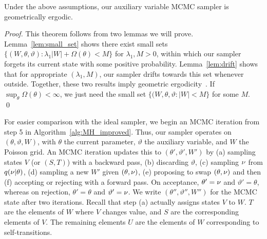 

\begin{theorem}
Under the above assumptions, our auxiliary variable MCMC sampler is
geometrically ergodic.  \label{thm:geom_erg}
\end{theorem}
\begin{proof}
\noindent This theorem follows from two lemmas we will prove.
Lemma~\ref{lem:small_set} shows there exist small sets 
$\{(W,\theta,\vartheta): \lambda_1|W| + \Omega(\theta) < M \}$ for 
$\lambda_1, M > 0$, within which our sampler forgets its current state with 
some positive probability. Lemma~\ref{lem:drift}
shows that for appropriate $(\lambda_1,M)$, our sampler drifts towards this set whenever
outside. Together, these two results imply geometric
ergodicity~\citep[Theorems 15.0.1 and Lemma 15.2.8]{meyn2009}.
If $\sup_\theta \Omega(\theta) < \infty$, we just need 
the small set $\{(W,\theta,\vartheta: |W| < M \}$ for some $M$.
\qed
\end{proof}
For easier comparison with the ideal sampler, we begin an MCMC 
iteration from step 5 in
Algorithm~\ref{alg:MH_improved}. Thus, our sampler operates on 
$(\theta,\vartheta,W)$,  with $\theta$ the current 
parameter, $\vartheta$ the auxiliary variable, and $W$ the Poisson grid. 
An MCMC iteration updates this to $(\theta',\vartheta',W')$ by 
(a) sampling states $V$ (or $(S,T)$)  with a backward pass, 
(b) discarding $\vartheta$, (c) sampling $\nu$ from $q(\nu|\theta)$, 
(d) sampling a new $W'$ given $(\theta,\nu)$, (e) proposing to swap 
$(\theta,\nu)$ and then (f) accepting or rejecting with a forward pass. 
On acceptance, $\theta' = \nu$ and
$\vartheta' = \theta$, whereas on rejection, $\theta'=\theta$ and 
$\vartheta'=\nu$. We write $(\theta'',\vartheta'',W'')$ for the 
MCMC state after two iterations.
Recall that step (a) actually assigns states $V$ to $W$. $T$ are 
the elements of $W$ where $V$ changes value, and $S$ are the 
corresponding elements of $V$. The remaining elements $U$ are the elements 
of $W$ corresponding to self-transitions.
